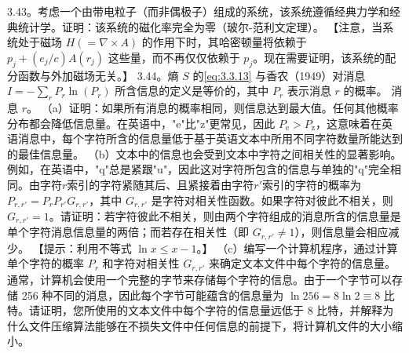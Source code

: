 3.43。考虑一个由带电粒子（而非偶极子）组成的系统，该系统遵循经典力学和经典统计学。证明：该系统的磁化率完全为零（玻尔-范利文定理）。
【注意，当系统处于磁场 \(H(= \nabla \times A)\) 的作用下时，其哈密顿量将依赖于 \(p_j + (e_j/c)A(r_j)\) 这些量，而不再仅仅依赖于 \(p_j\)。现在需要证明，该系统的配分函数与外加磁场无关。】
3.44。熵 \(S\) 的\autoref{eq:3.3.13} 与香农（1949）对消息 \(I = -\sum_r P_r \ln(P_r)\) 所含信息的定义是等价的，其中 \(P_r\) 表示消息 \(r\) 的概率。
消息 \(r\)。
（a）证明：如果所有消息的概率相同，则信息达到最大值。任何其他概率分布都会降低信息量。在英语中，"e"比"z"更常见，因此 \(P_{\mathrm{e}} > P_{\mathrm{z}}\)，这意味着在英语消息中，每个字符所含的信息量低于基于英语文本中所用不同字符数量所能达到的最佳信息量。
（b）文本中的信息也会受到文本中字符之间相关性的显著影响。例如，在英语中，"q"总是紧跟"u"，因此这对字符所包含的信息与单独的"q"完全相同。由字符\(r\)索引的字符紧随其后、且紧接着由字符\(r'\)索引的字符的概率为 \(P_{r,r'} = P_{r}P_{r'}G_{r,r'}\)，其中 \(G_{r,r'}\) 是字符对相关性函数。如果字符对彼此不相关，则 \(G_{r,r'} = 1\)。请证明：若字符彼此不相关，则由两个字符组成的消息所含的信息量是单个字符消息信息量的两倍；而若存在相关性（即 \(G_{r,r'} \neq 1\)），则信息量会相应减少。
【提示：利用不等式 \(\ln x \leq x - 1\)。】
（c）编写一个计算机程序，通过计算单个字符的概率 \(P_{r}\) 和字符对相关性 \(G_{r,r'}\) 来确定文本文件中每个字符的信息量。通常，计算机会使用一个完整的字节来存储每个字符的信息。由于一个字节可以存储 256 种不同的消息，因此每个字节可能蕴含的信息量为 \(\ln 256 = 8 \ln 2 \equiv 8\) 比特。请证明，您所使用的文本文件中每个字符的信息量远低于 8 比特，并解释为什么文件压缩算法能够在不损失文件中任何信息的前提下，将计算机文件的大小缩小。

